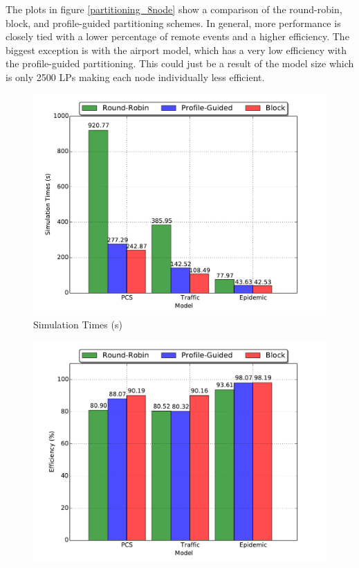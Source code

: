 \documentclass[11pt]{book}
\begin{document}
The plots in figure \ref{partitioning_8node} show a comparison of the round-robin, block, and
profile-guided partitioning schemes.  In general, more performance is closely tied with a lower
percentage of remote events and a higher efficiency.  The biggest exception is with the airport
model, which has a very low efficiency with the profile-guided partitioning.  This could just
be a result of the model size which is only 2500 LPs making each node individually less efficient.

\begin{figure}
  \begin{minipage}{.5\textwidth}
    \begin{center}
      \includegraphics[width=\textwidth,keepaspectratio,quiet]{figs/partitioning_communication/partitioning_time_8node.pdf} \\
      Simulation Times (s) \\
    \end{center}
  \end{minipage}%
  \hfill
  \begin{minipage}{.5\textwidth}
    \begin{center}
      \includegraphics[width=\textwidth,keepaspectratio,quiet]{figs/partitioning_communication/partitioning_efficiency_8node.pdf} \\

\end{center}
\end{minipage}
\end{figure}
\end{document}
